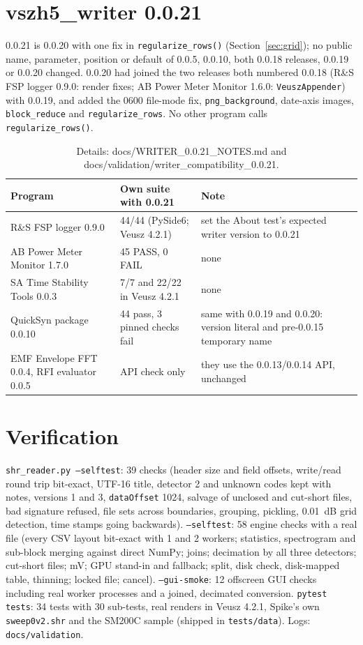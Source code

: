 \documentclass[11pt,a4paper]{article}
\newcommand{\code}[1]{\texttt{#1}}
\begin{document}
\section{vszh5\_writer 0.0.21}
0.0.21 is 0.0.20 with one fix in \code{regularize\_rows()} (Section~\ref{sec:grid}); no public
name, parameter, position or default of 0.0.5, 0.0.10, both 0.0.18 releases, 0.0.19 or 0.0.20 changed. 0.0.20
had joined the two releases both numbered 0.0.18 (R\&S FSP logger 0.9.0: render fixes; AB Power Meter Monitor
1.6.0: \code{VeuszAppender}) with 0.0.19, and added the 0600 file-mode fix, \code{png\_background}, date-axis
images, \code{block\_reduce} and \code{regularize\_rows}. No other program calls \code{regularize\_rows()}.
\begin{longtable}{p{4.0cm}p{5.0cm}p{6.0cm}}
\caption{Details: docs/WRITER\_0.0.21\_NOTES.md and docs/validation/writer\_compatibility\_0.0.21.}\\
\toprule
\textbf{Program} & \textbf{Own suite with 0.0.21} & \textbf{Note}\\
\midrule
\endhead
R\&S FSP logger 0.9.0 & 44/44 (PySide6; Veusz 4.2.1) & set the About test's expected writer version to 0.0.21\\
AB Power Meter Monitor 1.7.0 & 45 PASS, 0 FAIL & none\\
SA Time Stability Tools 0.0.3 & 7/7 and 22/22 in Veusz 4.2.1 & none\\
QuickSyn package 0.0.10 & 44 pass, 3 pinned checks fail & same with 0.0.19 and 0.0.20: version literal and pre-0.0.15 temporary name\\
EMF Envelope FFT 0.0.4, RFI evaluator 0.0.5 & API check only & they use the 0.0.13/0.0.14 API, unchanged\\
\bottomrule
\end{longtable}

\section{Verification}
\code{shr\_reader.py --selftest}: 39 checks (header size and field offsets, write/read round trip
bit-exact, UTF-16 title, detector 2 and unknown codes kept with notes, versions 1 and 3, \code{dataOffset}
1024, salvage of unclosed and cut-short files, bad signature refused, file sets across boundaries, grouping,
pickling, 0.01~dB grid detection, time stamps going backwards). \code{--selftest}:
58 engine checks with a real file (every CSV layout bit-exact with 1 and 2 workers; statistics, spectrogram
and sub-block merging against direct NumPy; joins; decimation by all three detectors; cut-short files; mV; GPU
stand-in and fallback; split, disk check, disk-mapped table, thinning; locked file; cancel).
\code{--gui-smoke}: 12 offscreen GUI checks including real worker processes and a joined, decimated conversion.
\code{pytest tests}: 34 tests with 30 sub-tests, real renders in Veusz 4.2.1, Spike's own
\code{sweep0v2.shr} and the SM200C sample (shipped in \code{tests/data}). Logs: \code{docs/validation}.
\end{document}
